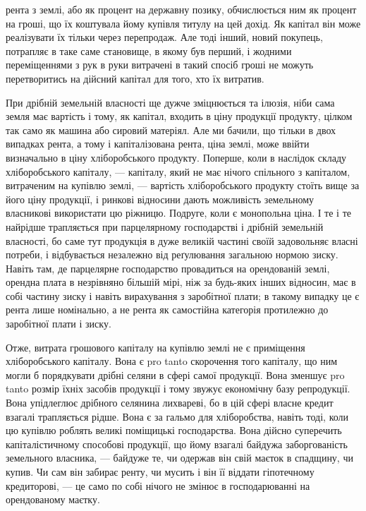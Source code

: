 \parcont{}  %
рента з землі, або як процент на державну позику, обчислюється ним як процент
на гроші, що їх коштувала йому купівля титулу на цей дохід. Як капітал
він може реалізувати їх тільки через перепродаж. Але тоді інший, новий покупець,
потрапляє в таке саме становище, в якому був перший, і жодними переміщеннями
з рук в руки витрачені в такий спосіб гроші не можуть перетворитись
на дійсний капітал для того, хто їх витратив.

При дрібній земельній власності ще дужче зміцнюється та ілюзія, ніби
сама земля має вартість і тому, як капітал, входить в ціну продукції продукту,
цілком так само як машина або сировий матеріял. Але ми бачили, що тільки
в двох випадках рента, а тому і капіталізована рента, ціна землі, може ввійти
визначально в ціну хліборобського продукту. Поперше, коли в наслідок складу
хліборобського капіталу, — капіталу, який не має нічого спільного з капіталом,
витраченим на купівлю землі, — вартість хліборобського продукту стоїть вище за
його ціну продукції, і ринкові відносини дають можливість земельному власникові
використати цю ріжницю. Подруге, коли є монопольна ціна. І те і те
найрідше трапляється при парцелярному господарстві і дрібній земельній
власності, бо саме тут продукція в дуже великій частині своїй задовольняє
власні потреби, і відбувається незалежно від реґулювання загальною нормою
зиску. Навіть там, де парцелярне господарство провадиться на орендованій землі,
орендна плата в незрівняно більшій мірі, ніж за будь-яких інших відносин,
має в собі частину зиску і навіть вирахування з заробітної плати; в такому
випадку це є рента лише номінально, а не рента як самостійна категорія
протилежно до заробітної плати і зиску.

Отже, витрата грошового капіталу на купівлю землі не є приміщення хліборобського
капіталу. Вона є pro tanto скорочення того капіталу, що ним могли б
порядкувати дрібні селяни в сфері самої продукції. Вона зменшує pro tanto розмір
їхніх засобів продукції і тому звужує економічну базу репродукції. Вона
упідлеглює дрібного селянина лихвареві, бо в цій сфері власне кредит взагалі
трапляється рідше. Вона є за гальмо для хліборобства, навіть тоді, коли цю
купівлю роблять великі поміщицькі господарства. Вона дійсно суперечить капіталістичному
способові продукції, що йому взагалі байдужа заборгованість
земельного власника, — байдуже те, чи одержав він свій маєток в спадщину, чи
купив. Чи сам він забирає ренту, чи мусить і він її віддати гіпотечному кредиторові,
— це само по собі нічого не змінює в господарюванні на орендованому
маєтку.

